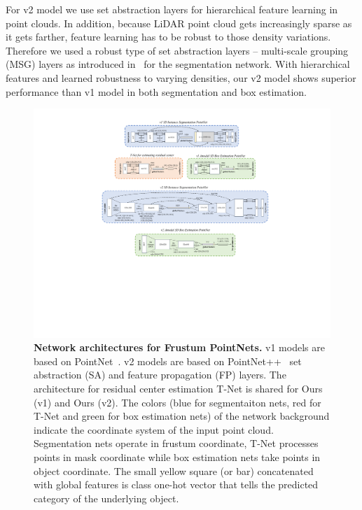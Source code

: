 For v2 model we use set abstraction layers for hierarchical feature learning in point clouds. In addition, because LiDAR point cloud gets increasingly sparse as it gets farther, feature learning has to be robust to those density variations. Therefore we used a robust type of set abstraction layers -- multi-scale grouping (MSG) layers as introduced in~\cite{qi2017pointnetplusplus} for the segmentation network. With hierarchical features and learned robustness to varying densities, our v2 model shows superior performance than v1 model in both segmentation and box estimation.

\begin{figure}
    \centering
    \includegraphics{./fig/arch}
    \caption{\textbf{Network architectures for Frustum PointNets.} v1 models are based on PointNet~\cite{qi2017pointnet}. v2 models are based on PointNet++~\cite{qi2017pointnetplusplus} set abstraction (SA) and feature propagation (FP) layers. The architecture for residual center estimation T-Net is shared for Ours (v1) and Ours (v2). The colors (blue for segmentaiton nets, red for T-Net and green for box estimation nets) of the network background indicate the coordinate system of the input point cloud. Segmentation nets operate in frustum coordinate, T-Net processes points in mask coordinate while box estimation nets take points in object coordinate. The small yellow square (or bar) concatenated with global features is class one-hot vector that tells the predicted category of the underlying object.}
    \label{fig:arch}
\end{figure}

